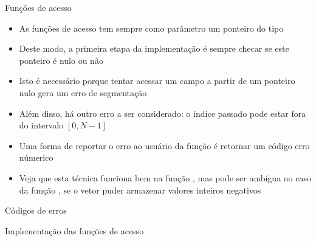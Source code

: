 \begin{frame}[fragile]{Funções de acesso}

    \begin{itemize}
        \item As funções de acesso tem sempre como parâmetro um ponteiro do tipo 

        \item Deste modo, a primeira etapa da implementação é sempre checar se este ponteiro
        é nulo ou não

        \item Isto é necessário porque tentar acessar um campo a partir de um ponteiro nulo
        gera um erro de segmentação

        \item Além disso, há outro erro a ser considerado: o índice passado pode estar fora do
        intervalo $[0, N - 1]$

        \item Uma forma de reportar o erro ao usuário da função é retornar um código erro númerico

        \item Veja que esta técnica funciona bem na função , mas pode ser 
        ambígua no caso da função , se o vetor puder armazenar valores
        inteiros negativos

    \end{itemize}

\end{frame}

\begin{frame}[fragile]{Códigos de erros}
\end{frame}

\begin{frame}[fragile]{Implementação das funções de acesso}
\end{frame}
